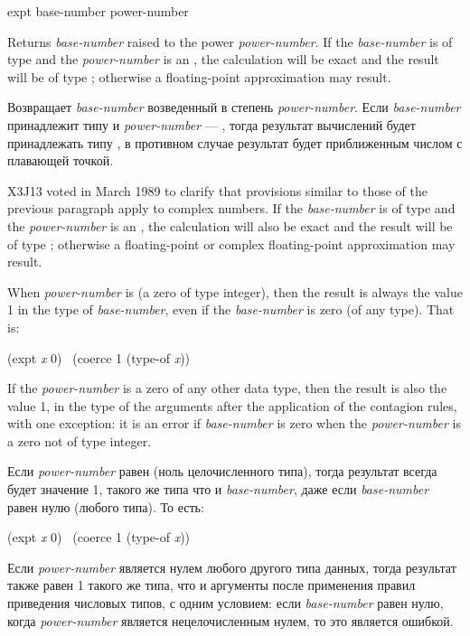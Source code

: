 \begin{defun}[Function]
expt base-number power-number

Returns \emph{base-number} raised to the power \emph{power-number}.
If the \emph{base-number} is of type  and the \emph{power-number} is
an ,
the calculation will be exact and the result will be of type ;
otherwise a floating-point approximation may result.

Возвращает \emph{base-number} возведенный в степень \emph{power-number}.
Если \emph{base-number} принадлежит типу  и \emph{power-number}
--- , тогда результат вычислений будет принадлежать типу
, в противном случае результат будет приближенным числом с
плавающей точкой.

\begin{newer}
X3J13 voted in March 1989
to clarify that provisions similar to those of the previous paragraph apply to complex
numbers.  If the \emph{base-number} is of type 
and the \emph{power-number} is
an ,
the calculation will also be exact and the result will be of type
;
otherwise a floating-point or complex floating-point approximation may result.
\end{newer}

When \emph{power-number} is  (a zero of type integer),
then the result is always the value 1 in the type of \emph{base-number},
even if the \emph{base-number} is zero (of any type).  That is:
\begin{lisp}
(expt \emph{x} 0) \EQ\ (coerce 1 (type-of \emph{x}))
\end{lisp}
If the \emph{power-number} is a zero of any other data type,
then the result is also the value 1, in the type of the arguments
after the application of the contagion rules, with one exception:
it is an error if \emph{base-number} is zero when the \emph{power-number}
is a zero not of type integer.

Если \emph{power-number} равен  (ноль целочисленного типа), тогда
результат всегда будет значение 1, такого же типа что и \emph{base-number}, даже
если \emph{base-number} равен нулю (любого типа). То есть:
\begin{lisp}
(expt \emph{x} 0) \EQ\ (coerce 1 (type-of \emph{x}))
\end{lisp}
Если \emph{power-number} является нулем любого другого типа данных, тогда
результат также равен 1 такого же типа, что и аргументы после применения правил
приведения числовых типов, с одним условием:
если \emph{base-number} равен нулю, когда \emph{power-number} является
нецелочисленным нулем, то это является ошибкой.


\end{defun}
